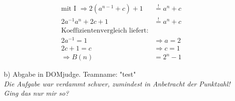 \documentclass{article}
\begin{document}
\begin{enumerate}
\begin{align*}
            \textrm{mit I } \Rightarrow 2\left(a^{n-1}+c\right)+1 &\stackrel{!}{=} a^n + c \\
            2a^{-1}a^n + 2c + 1 &\stackrel{!}{=} a^n + c\\
            \textrm{Koeffizientenvergleich liefert:}\\
            2a^{-1}=1 &\Rightarrow a=2\\
            2c+1 = c &\Rightarrow c =1\\
            \Rightarrow B(n) &= 2^n-1
        \end{align*}
        \item[b)]
        Abgabe in DOMjudge. Teamname: "test" \\
        \textit{Die Aufgabe war verdammt schwer, zumindest in Anbetracht der Punktzahl! Ging das nur mir so?}
    \end{enumerate}
\end{document}
